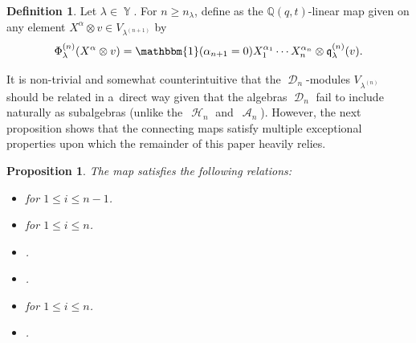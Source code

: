 \documentclass[10pt,a4paper]{amsart}
\numberwithin{equation}{section}
\newtheorem{Proposition}[Theorem]{Proposition}
\theoremstyle{definition}
\newtheorem{Definition}[Theorem]{Definition}
\DeclareMathOperator{\Par}{\mathbb{Y}}
\DeclareMathOperator{\sH}{\mathscr{H}}
\DeclareMathOperator{\sA}{\mathscr{A}}
\DeclareMathOperator{\sD}{\mathscr{D}}
\begin{document}
\begin{Definition}\label{connecting maps def}
 Let $\lambda \in \Par$. For $n \geq n_{\lambda}$, define  as the $\mathbb{Q}(q,t)$-linear map given on any element $X^{\alpha}\otimes v \in V_{\lambda^{(n+1)}}$ by
 \[
 \Phi^{(n)}_{\lambda}(X^{\alpha}\otimes v) = \mathbbm{1}(\alpha_{n+1} = 0) X_1^{\alpha_1}\cdots X_n^{\alpha_n}\otimes \mathfrak{q}^{(n)}_{\lambda}(v).
 \]

\end{Definition}

 It is non-trivial and somewhat counterintuitive that the $\sD_n$-modules $V_{\lambda^{(n)}}$ should be related in a~direct way given that the algebras $\sD_n$ fail to include naturally as subalgebras (unlike the~$\sH_n$ and~$\sA_n$). However, the next proposition shows that the connecting maps  satisfy multiple exceptional properties upon which the remainder of this paper heavily relies.

\begin{Proposition}\label{relations for connecting maps}
 The map  satisfies the following relations:
 \begin{itemize}
\itemsep=0pt
 \item {} for $1\leq i \leq n-1$.
 \item {} for $1\leq i \leq n$.
 \item {}.
 \item {}.
 \item {} for $1\leq i \leq n$.
 \item {}.
 \end{itemize}
\end{Proposition}
\end{document}
